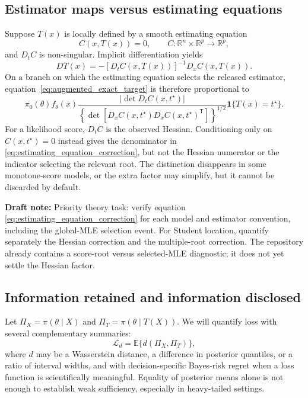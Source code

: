 \documentclass[smallextended,natbib,runningheads]{svjour3}
\newcommand{\draftnote}[1]{\textcolor{blue!70!black}{\textbf{Draft note:} #1}}
\newcommand{\R}{\mathbb{R}}
\begin{document}
\subsection{Estimator maps versus estimating equations}
\label{sec:score-versus-mle}

Suppose $T(x)$ is locally defined by a smooth estimating equation
\[
 C(x,T(x))=0,\qquad C:\R^n\times\R^p\to\R^p,
\]
and $D_tC$ is non-singular.  Implicit differentiation yields
\[
 DT(x)=-[D_tC(x,T(x))]^{-1}D_xC(x,T(x)).
\]
On a branch on which the estimating equation selects the released estimator,
equation~\eqref{eq:augmented_exact_target} is therefore proportional to
\begin{equation}
 \pi_0(\theta)f_\theta(x)
 \frac{|\det D_tC(x,t^\star)|}
 {\left\{\det[D_xC(x,t^\star)D_xC(x,t^\star)^\mathsf T]\right\}^{1/2}}
 \mathbf 1\{T(x)=t^\star\}.
 \label{eq:estimating_equation_correction}
\end{equation}
For a likelihood score, $D_tC$ is the observed Hessian.  Conditioning only on
$C(x,t^\star)=0$ instead gives the denominator in
\eqref{eq:estimating_equation_correction}, but not the Hessian numerator or the
indicator selecting the relevant root.  The distinction disappears in some
monotone-score models, or the extra factor may simplify, but it cannot be
discarded by default.

\draftnote{Priority theory task: verify equation
\eqref{eq:estimating_equation_correction} for each model and estimator
convention, including the global-MLE selection event.  For Student location,
quantify separately the Hessian correction and the multiple-root correction.
The repository already contains a score-root versus selected-MLE diagnostic;
it does not yet settle the Hessian factor.}

\subsection{Information retained and information disclosed}

Let $\Pi_X=\pi(\theta\mid X)$ and
$\Pi_T=\pi(\theta\mid T(X))$.  We will quantify loss with several complementary
summaries:
\begin{equation}
 \mathcal L_d=\mathbb E\{d(\Pi_X,\Pi_T)\},
 \label{eq:posterior_loss}
\end{equation}
where $d$ may be a Wasserstein distance, a difference in posterior quantiles,
or a ratio of interval widths, and with decision-specific Bayes-risk regret
when a loss function is scientifically meaningful.  Equality of posterior
means alone is not enough to establish weak sufficiency, especially in
heavy-tailed settings.
\end{document}
